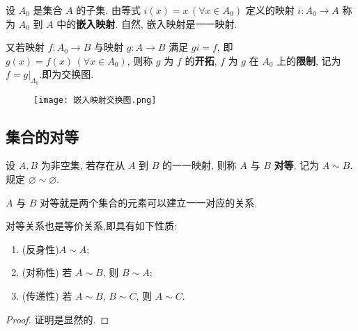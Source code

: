 \documentclass[../../main.tex]{subfiles}
\begin{document}
\begin{definition}
设 \( A_0 \) 是集合 \( A \) 的子集. 由等式 \( i(x)=x \, (\forall x \in A_0) \) 定义的映射 \( i:A_0 \to A \) 称为 \( A_0 \) 到 \( A \) 中的\textbf{嵌入映射}. 自然, 嵌入映射是一一映射.

又若映射 \( f:A_0 \to B \) 与映射 \( g:A \to B \) 满足 \( gi = f \), 即 \( g(x)=f(x) \, (\forall x \in A_0) \), 则称 \( g \) 为 \( f \) 的\textbf{开拓}, \( f \) 为 \( g \) 在 \( A_0 \) 上的\textbf{限制}, 记为 \( f = g|_{A_0} \).即为交换图.
\end{definition}
\begin{figure}[H]
\centering
\texttt{[image: 嵌入映射交换图.png]}
\caption{}
\label{figure:嵌入映射交换图}
\end{figure}



\subsection{集合的对等}

\begin{definition}[集合的对等]
设 $A, B$ 为非空集, 若存在从 $A$ 到 $B$ 的一一映射, 则称 $A$ 与 $B$ \textbf{对等}, 记为 $A \sim B$. 规定 $\varnothing \sim \varnothing$.
\end{definition}
\begin{note}
$A$ 与 $B$ 对等就是两个集合的元素可以建立一一对应的关系. 
\end{note}

\begin{theorem}\label{theorem:对等关系也是等价关系}
对等关系也是等价关系,即具有如下性质:
\begin{enumerate}[(1)]
\item (反身性)$A \sim A$;
\item (对称性) 若 $A \sim B$, 则 $B \sim A$;
\item (传递性) 若 $A \sim B$, $B \sim C$, 则 $A \sim C$.
\end{enumerate} 
\end{theorem}
\begin{proof}
证明是显然的.

\end{proof}
\end{document}
